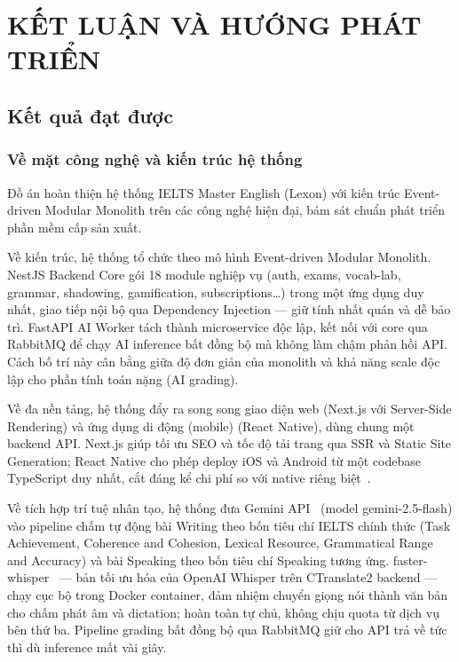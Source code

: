 \chapter{KẾT LUẬN VÀ HƯỚNG PHÁT TRIỂN}
\thispagestyle{mainstyle}

\section{Kết quả đạt được}

\subsection{Về mặt công nghệ và kiến trúc hệ thống}

Đồ án hoàn thiện hệ thống IELTS Master English (Lexon) với kiến trúc Event-driven Modular Monolith trên các công nghệ hiện đại, bám sát chuẩn phát triển phần mềm cấp sản xuất.

Về kiến trúc, hệ thống tổ chức theo mô hình Event-driven Modular Monolith. NestJS Backend Core gói 18 module nghiệp vụ (auth, exams, vocab-lab, grammar, shadowing, gamification, subscriptions\ldots) trong một ứng dụng duy nhất, giao tiếp nội bộ qua Dependency Injection --- giữ tính nhất quán và dễ bảo trì. FastAPI AI Worker tách thành microservice độc lập, kết nối với core qua RabbitMQ để chạy AI inference bất đồng bộ mà không làm chậm phản hồi API. Cách bố trí này cân bằng giữa độ đơn giản của monolith và khả năng scale độc lập cho phần tính toán nặng (AI grading).

Về đa nền tảng, hệ thống đẩy ra song song giao diện web (Next.js với Server-Side Rendering) và ứng dụng di động (mobile) (React Native), dùng chung một backend API. Next.js giúp tối ưu SEO và tốc độ tải trang qua SSR và Static Site Generation; React Native cho phép deploy iOS và Android từ một codebase TypeScript duy nhất, cắt đáng kể chi phí so với native riêng biệt~\cite{reactnative-docs}.

Về tích hợp trí tuệ nhân tạo, hệ thống đưa Gemini API~\cite{gemini-api} (model gemini-2.5-flash) vào pipeline chấm tự động bài Writing theo bốn tiêu chí IELTS chính thức (Task Achievement, Coherence and Cohesion, Lexical Resource, Grammatical Range and Accuracy) và bài Speaking theo bốn tiêu chí Speaking tương ứng. faster-whisper~\cite{whisper-paper} --- bản tối ưu hóa của OpenAI Whisper trên CTranslate2 backend --- chạy cục bộ trong Docker container, đảm nhiệm chuyển giọng nói thành văn bản cho chấm phát âm và dictation; hoàn toàn tự chủ, không chịu quota từ dịch vụ bên thứ ba. Pipeline grading bất đồng bộ qua RabbitMQ giữ cho API trả về tức thì dù inference mất vài giây.

